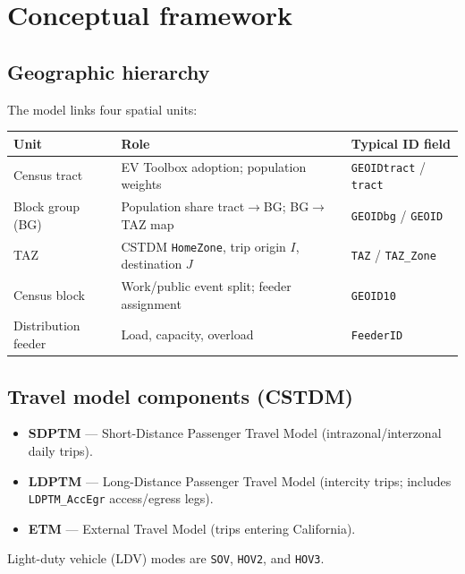 \documentclass[11pt,a4paper]{article}
\begin{document}
\section{Conceptual framework}

\subsection{Geographic hierarchy}

The model links four spatial units:

\begin{center}
\begin{tabular}{lll}
\toprule
\textbf{Unit} & \textbf{Role} & \textbf{Typical ID field} \\
\midrule
Census tract & EV Toolbox adoption; population weights & \texttt{GEOIDtract} / \texttt{tract} \\
Block group (BG) & Population share tract$\to$BG; BG$\to$TAZ map & \texttt{GEOIDbg} / \texttt{GEOID} \\
TAZ & CSTDM \texttt{HomeZone}, trip origin $I$, destination $J$ & \texttt{TAZ} / \texttt{TAZ\_Zone} \\
Census block & Work/public event split; feeder assignment & \texttt{GEOID10} \\
Distribution feeder & Load, capacity, overload & \texttt{FeederID} \\
\bottomrule
\end{tabular}
\end{center}

\subsection{Travel model components (CSTDM)}

\begin{itemize}[noitemsep]
  \item \textbf{SDPTM} --- Short-Distance Passenger Travel Model (intrazonal/interzonal daily trips).
  \item \textbf{LDPTM} --- Long-Distance Passenger Travel Model (intercity trips; includes \texttt{LDPTM\_AccEgr} access/egress legs).
  \item \textbf{ETM} --- External Travel Model (trips entering California).
\end{itemize}

Light-duty vehicle (LDV) modes are \texttt{SOV}, \texttt{HOV2}, and \texttt{HOV3}.
\end{document}
